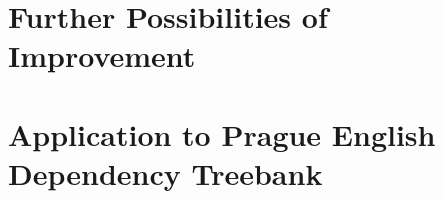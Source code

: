 \documentclass[12pt,notitlepage]{report}
\begin{document}
\section{Further Possibilities of Improvement}
\section{Application to Prague English Dependency Treebank}

\cleardoublepage
{}
\printnomenclature[2cm]
\cleardoublepage


\end{document}
